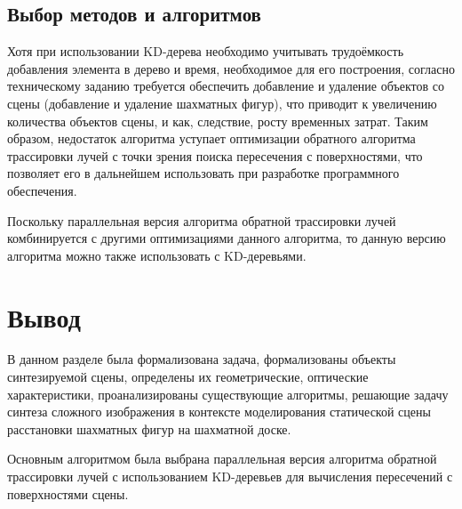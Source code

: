 \subsection{Выбор методов и алгоритмов}

Хотя при использовании KD-дерева необходимо учитывать трудоёмкость добавления элемента в дерево и время, необходимое для его построения, согласно техническому заданию требуется обеспечить добавление и удаление объектов со сцены (добавление и удаление шахматных фигур), что приводит к увеличению количества объектов сцены, и как, следствие, росту временных затрат. Таким образом, недостаток алгоритма уступает оптимизации обратного алгоритма трассировки лучей с точки зрения поиска пересечения с поверхностями, что позволяет его в дальнейшем использовать при разработке программного обеспечения.

Поскольку параллельная версия алгоритма обратной трассировки лучей комбинируется с другими оптимизациями данного алгоритма, то данную версию алгоритма можно также использовать с KD-деревьями.

\section*{Вывод}

В данном разделе была формализована задача, формализованы объекты синтезируемой сцены, определены их геометрические, оптические характеристики, проанализированы существующие алгоритмы, решающие задачу синтеза сложного изображения в контексте моделирования статической сцены расстановки шахматных фигур на шахматной доске.

Основным алгоритмом была выбрана параллельная версия алгоритма обратной трассировки лучей с использованием KD-деревьев для вычисления пересечений с поверхностями сцены.
























